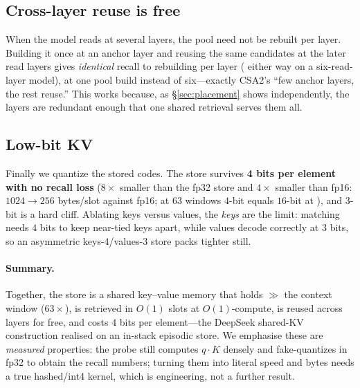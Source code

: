 \subsection{Cross-layer reuse is free}

When the model reads at several layers, the pool need not be rebuilt per layer.
Building it once at an anchor layer and reusing the same candidates at the later
read layers gives \emph{identical} recall to rebuilding per layer (
either way on a six-read-layer model), at one pool build instead of six---exactly
CSA2's ``few anchor layers, the rest reuse.'' This works because, as
\S\ref{sec:placement} shows independently, the layers are redundant enough that one
shared retrieval serves them all.

\subsection{Low-bit KV}

Finally we quantize the stored codes. The store survives \textbf{4 bits per element
with no recall loss} ($8\times$ smaller than the fp32 store and $4\times$ smaller than fp16: $1024\!\to\!256$ bytes/slot against fp16; at
$63$ windows $4$-bit equals $16$-bit at ), and $3$-bit is a hard
cliff. Ablating keys versus values, the \emph{keys} are the limit: matching needs
$4$ bits to keep near-tied keys apart, while values decode correctly at $3$ bits,
so an asymmetric keys-$4$/values-$3$ store packs tighter still.

\paragraph{Summary.} Together, the store is a shared key--value memory that holds
$\gg$ the context window ($63\times$), is retrieved in $O(1)$ slots at
$O(1)$-compute, is reused across layers for free, and costs $4$ bits per
element---the DeepSeek shared-KV construction realised on an in-stack episodic
store. We emphasise these are \emph{measured} properties: the probe still computes
$q\!\cdot\!K$ densely and fake-quantizes in fp32 to obtain the recall numbers;
turning them into literal speed and bytes needs a true hashed/int4 kernel, which is
engineering, not a further result.
